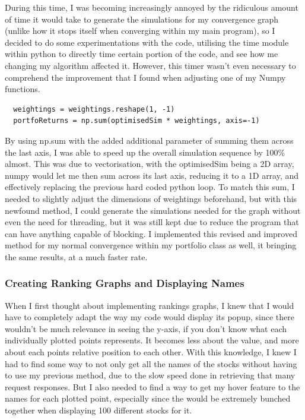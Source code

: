 \documentclass{article}
\begin{document}
During this time, I was becoming increasingly annoyed by the ridiculous amount of time it would take to generate the simulations for my convergence graph (unlike how it stops itself when converging within my main program), so I decided to do some experimentations with the code, utilising the time module within python to directly time certain portion of the code, and see how me changing my algorithm affected it. However, this timer wasn't even necessary to comprehend the improvement that I found when adjusting one of my Numpy functions. 

\begin{verbatim}
  weightings = weightings.reshape(1, -1)
  portfoReturns = np.sum(optimisedSim * weightings, axis=-1)
\end{verbatim}

\vspace{0.3cm}
By using np.sum with the added additional parameter of summing them across the last axis, I was able to speed up the overall simulation sequence by 100\% almost. This was due to vectorisation, with the optimisedSim being a 2D array, numpy would let me then sum across its last axis, reducing it to a 1D array, and effectively replacing the previous hard coded python loop. To match this sum, I needed to slightly adjust the dimensions of weightings beforehand, but with this newfound method, I could generate the simulations needed for the graph without even the need for threading, but it was still kept due to reduce the program that can have anything capable of blocking. I implemented this revised and improved method for my normal convergence within my portfolio class as well, it bringing the same results, at a much faster rate.\\\vspace{0.3cm}

\subsubsection{Creating Ranking Graphs and Displaying Names}
When I first thought about implementing rankings graphs, I knew that I would have to completely adapt the way my code would display its popup, since there wouldn't be much relevance in seeing the y-axis, if you don't know what each individually plotted points represents. It becomes less about the value, and more about each points relative position to each other. With this knowledge, I knew I had to find some way to not only get all the names of the stocks without having to use my previous method, due to the slow speed done in retrieving that many request responses. But I also needed to find a way to get my hover feature to the names for each plotted point, especially since the would be extremely bunched together when displaying 100 different stocks for it.\\\vspace{0.3cm}
\end{document}
